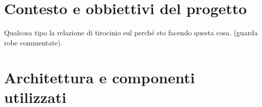 \chapter{Contesto e obbiettivi del progetto}
Qualcosa tipo la relazione di tirocinio sul perché sto facendo questa cosa. (guarda robe commentate).
%
%
\chapter{Architettura e componenti utilizzati}
